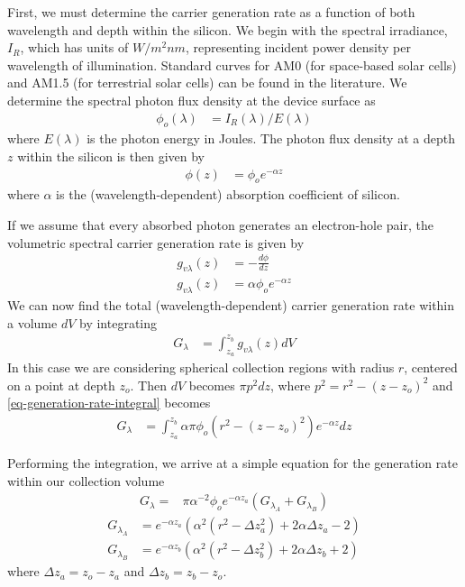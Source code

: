 \documentclass[journal,twoside]{IEEEtran}
\begin{document}
First, we must determine the carrier generation rate as a function of both wavelength and depth within the silicon.
We begin with the spectral irradiance, $I_R$, which has units of $W/m^2nm$, representing incident power density per
wavelength of illumination. Standard curves for AM0 (for space-based solar cells) and AM1.5 (for terrestrial solar cells)
can be found in the literature. We determine the spectral photon flux density at the device surface as
\begin{align}
	\phi_o(\lambda) &= I_R(\lambda)/E(\lambda)	\label{eq-spectral-flux-density}
\end{align}
where $E(\lambda)$ is the photon energy in Joules. The photon flux density at a depth $z$ within the silicon
is then given by
\begin{align}
	\phi(z) &= \phi_o e^{-\alpha z}	\label{eq-flux-density-depth}
\end{align}
where $\alpha$ is the (wavelength-dependent) absorption coefficient of silicon.

If we assume that every absorbed photon generates an electron-hole pair, the volumetric spectral carrier generation rate is
given by
\begin{align}
	g_{v\lambda}(z) &= -\frac{d\phi}{dz} \\
	g_{v\lambda}(z) &= \alpha \phi_o e^{-\alpha z}	\label{eq-generation-rate-depth}
\end{align}
We can now find the total (wavelength-dependent) carrier generation rate within a volume $dV$ by integrating
\begin{align}
	G_\lambda &= \int_{z_a}^{z_b} g_{v\lambda}(z) dV	\label{eq-generation-rate-integral-abstract}
\end{align}
In this case we are considering spherical collection regions with radius $r$, centered on a point at depth $z_o$.
Then $dV$ becomes $\pi p^2 dz$, where $p^2 = r^2 - (z-z_o)^2$ and \cref{eq-generation-rate-integral} becomes
\begin{align}
	G_\lambda &= \int_{z_a}^{z_b} \alpha \pi \phi_o \left(r^2- \left(z - z_o\right)^2\right) e^{-\alpha z} dz	\label{eq-generation-rate-integral}
\end{align}

Performing the integration, we arrive at a simple equation for the generation rate within our collection volume
\begin{align}
	G_\lambda = &\pi \alpha^{-2} \phi_o e^{-\alpha z_a} \left( G_{\lambda_A} + G_{\lambda_B} \right)	\label{eq-generation-rate-full}
\end{align}
\begin{align}
	G_{\lambda_A} &= e^{-\alpha z_a} \left( \alpha^2 (r^2-\Delta z_a^2 ) + 2\alpha\Delta z_a - 2\right)	\label{eq-generation-rate-full-A}	\\
	G_{\lambda_B} &= e^{-\alpha z_b} \left( \alpha^2 (r^2-\Delta z_b^2 ) + 2\alpha\Delta z_b + 2\right)	\label{eq-generation-rate-full-B}
\end{align}
where $\Delta z_a = z_o - z_a$ and $\Delta z_b = z_b - z_o$.
\end{document}
